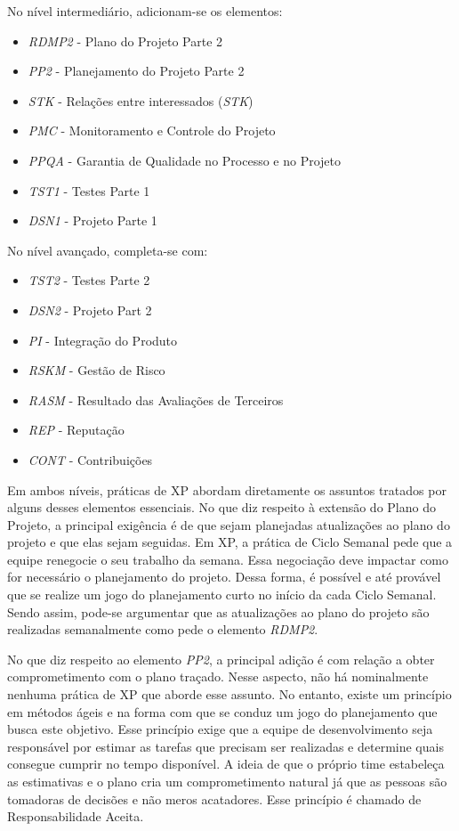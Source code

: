 No nível intermediário, adicionam-se os elementos:
\begin{itemize}
\item \textit{RDMP2} - Plano do Projeto Parte 2
\item \textit{PP2} - Planejamento do Projeto Parte 2
\item \textit{STK} - Relações entre interessados (\textit{STK})
\item \textit{PMC} - Monitoramento e Controle do Projeto
\item \textit{PPQA} - Garantia de Qualidade no Processo e no Projeto
\item \textit{TST1} - Testes Parte 1
\item \textit{DSN1} - Projeto Parte 1
\end{itemize}

No nível avançado, completa-se com:
\begin{itemize}
\item \textit{TST2} - Testes Parte 2
\item \textit{DSN2} - Projeto Part 2
\item \textit{PI} - Integração do Produto
\item \textit{RSKM} - Gestão de Risco
\item \textit{RASM} - Resultado das Avaliações de Terceiros
\item \textit{REP} - Reputação
\item \textit{CONT} - Contribuições
\end{itemize}

Em ambos níveis, práticas de XP abordam diretamente os assuntos
tratados por alguns desses elementos essenciais. No que diz respeito à
extensão do Plano do Projeto, a principal exigência é de que sejam
planejadas atualizações ao plano do projeto e que elas sejam
seguidas. Em XP, a prática de Ciclo Semanal pede que a equipe
renegocie o seu trabalho da semana. Essa negociação deve impactar como
for necessário o planejamento do projeto. Dessa forma, é possível e
até provável que se realize um jogo do planejamento curto no início da
cada Ciclo Semanal. Sendo assim, pode-se argumentar que as
atualizações ao plano do projeto são realizadas semanalmente como pede
o elemento \textit{RDMP2}.

No que diz respeito ao elemento \textit{PP2}, a principal adição é com
relação a obter comprometimento com o plano traçado. Nesse aspecto,
não há nominalmente nenhuma prática de XP que aborde esse assunto. No
entanto, existe um princípio em métodos ágeis e na forma com que se
conduz um jogo do planejamento que busca este objetivo. Esse princípio
exige que a equipe de desenvolvimento seja responsável por estimar as
tarefas que precisam ser realizadas e determine quais consegue cumprir
no tempo disponível. A ideia de que o próprio time estabeleça as
estimativas e o plano cria um comprometimento natural já que as
pessoas são tomadoras de decisões e não meros acatadores. Esse
princípio é chamado de Responsabilidade Aceita.

